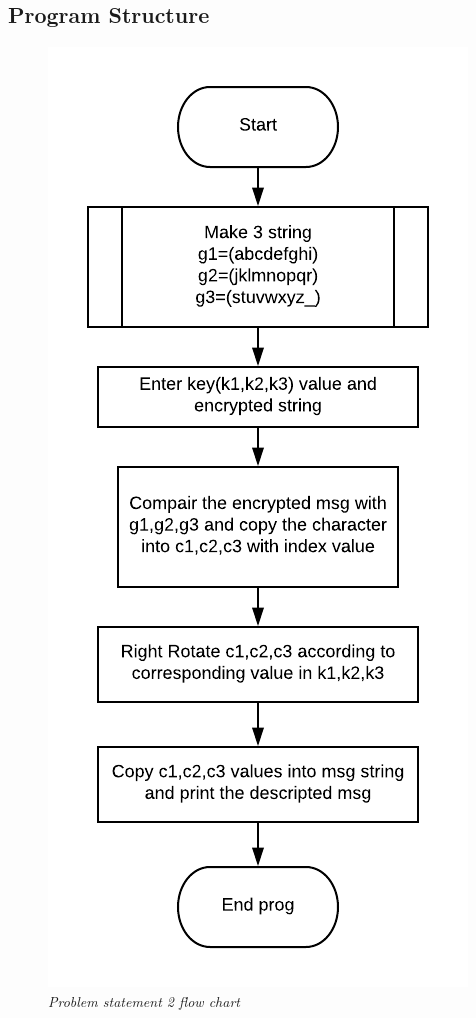 \documentclass[a4paper,12pt]{article}
\begin{document}
  \subsection{Program Structure}
  \begin{figure}[h!]     
       	\centering
       	\vspace{-2mm}
		\includegraphics[scale=1]{flow2}
		\vspace{-7mm}
		\caption{\textit{Problem statement 2 flow chart}}
		\end{figure}
\newpage		
\end{document}
